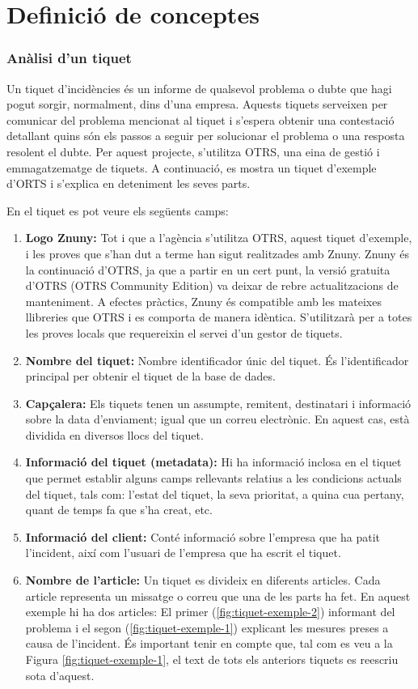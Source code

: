 \section{Definició de conceptes}
\subsubsection{Anàlisi d'un tiquet}
Un tiquet d'incidències és un informe de qualsevol problema o dubte que hagi pogut sorgir, normalment, dins d'una empresa. Aquests tiquets serveixen per comunicar del problema mencionat al tiquet i s'espera obtenir una contestació detallant quins són els passos a seguir per solucionar el problema o una resposta resolent el dubte. Per aquest projecte, s'utilitza OTRS, una eina de gestió i emmagatzematge de tiquets. A continuació, es mostra un tiquet d'exemple d'ORTS i s'explica en deteniment les seves parts.

En el tiquet es pot veure els següents camps:
\begin{enumerate}
    \item \textbf{Logo Znuny:} Tot i que a l'agència s'utilitza OTRS, aquest tiquet d'exemple, i les proves que s'han dut a terme han sigut realitzades amb Znuny. Znuny és la continuació d'OTRS, ja que a partir en un cert punt, la versió gratuita d'OTRS (OTRS Community Edition) va deixar de rebre actualitzacions de manteniment. A efectes pràctics, Znuny és compatible amb les mateixes llibreries que OTRS i es comporta de manera idèntica. S'utilitzarà per a totes les proves locals que requereixin el servei d'un gestor de tiquets.
    \item \textbf{Nombre del tiquet:} Nombre identificador únic del tiquet. És l'identificador principal per obtenir el tiquet de la base de dades.
    \item \textbf{Capçalera:} Els tiquets tenen un assumpte, remitent, destinatari i informació sobre la data d'enviament; igual que un correu electrònic. En aquest cas, està dividida en diversos llocs del tiquet.
    \item \textbf{Informació del tiquet (metadata):} Hi ha informació inclosa en el tiquet que permet establir alguns camps rellevants relatius a les condicions actuals del tiquet, tals com: l'estat del tiquet, la seva prioritat, a quina cua pertany, quant de temps fa que s'ha creat, etc.
    \item \textbf{Informació del client:} Conté informació sobre l'empresa que ha patit l'incident, així com l'usuari de l'empresa que ha escrit el tiquet.
    \item \textbf{Nombre de l'article:} Un tiquet es divideix en diferents articles. Cada article representa un missatge o correu que una de les parts ha fet. En aquest exemple hi ha dos articles: El primer (\ref{fig:tiquet-exemple-2}) informant del problema i el segon (\ref{fig:tiquet-exemple-1}) explicant les mesures preses a causa de l'incident. És important tenir en compte que, tal com es veu a la Figura \ref{fig:tiquet-exemple-1}, el text de tots els anteriors tiquets es reescriu sota d'aquest.
\end{enumerate}

